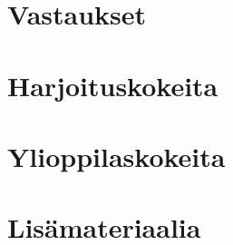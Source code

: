 \liitetyyli

\section{Vastaukset}
	

\section{Harjoituskokeita}
	
	
\section{Ylioppilaskokeita}
	

\section{Lisämateriaalia}
	
	
	
	

